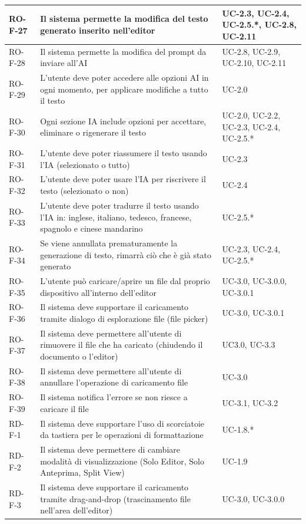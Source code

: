 \documentclass[11pt,a4paper]{article}
\begin{document}
\begin{longtable}{|p{}|>{\raggedright\arraybackslash}p{}|p{}|}
\hline
RO-F-27 & Il sistema permette la modifica del testo generato inserito nell'editor & UC-2.3, UC-2.4, UC-2.5.*, UC-2.8, UC-2.11 \\
\hline
RO-F-28 & Il sistema permette la modifica del prompt da inviare all'AI & UC-2.8, UC-2.9, UC-2.10, UC-2.11 \\
\hline
RO-F-29 & L'utente deve poter accedere alle opzioni AI in ogni momento, per applicare modifiche a tutto il testo & UC-2.0 \\
\hline
RO-F-30 & Ogni sezione IA include opzioni per accettare, eliminare o rigenerare il testo & UC-2.0, UC-2.2, UC-2.3, UC-2.4, UC-2.5.* \\
\hline
RO-F-31 & L'utente deve poter riassumere il testo usando l'IA (selezionato o tutto) & UC-2.3 \\
\hline
RO-F-32 & L'utente deve poter usare l'IA per riscrivere il testo (selezionato o non) & UC-2.4 \\
\hline
RO-F-33 & L'utente deve poter tradurre il testo usando l'IA in: inglese, italiano, tedesco, francese, spagnolo e cinese mandarino & UC-2.5.* \\
\hline
RO-F-34 & Se viene annullata prematuramente la generazione di testo, rimarrà ciò che è già stato generato & UC-2.3, UC-2.4, UC-2.5.* \\
\hline
RO-F-35 & L'utente può caricare/aprire un file dal proprio dispositivo all'interno dell'editor & UC-3.0, UC-3.0.0, UC-3.0.1 \\
\hline
RO-F-36 & Il sistema deve supportare il caricamento tramite dialogo di esplorazione file (file picker) & UC-3.0, UC-3.0.1 \\
\hline
RO-F-37 & Il sistema deve permettere all'utente di rimuovere il file che ha caricato (chiudendo il documento o l'editor) & UC3.0, UC-3.3 \\
\hline
RO-F-38 & Il sistema deve permettere all'utente di annullare l'operazione di caricamento file & UC-3.0 \\
\hline
RO-F-39 & Il sistema notifica l'errore se non riesce a caricare il file & UC-3.1, UC-3.2\\
\hline
RD-F-1 & Il sistema deve supportare l'uso di scorciatoie da tastiera per le operazioni di formattazione & UC-1.8.* \\
\hline
RD-F-2 & Il sistema deve permettere di cambiare modalità di visualizzazione (Solo Editor, Solo Anteprima, Split View) & UC-1.9 \\
\hline
RD-F-3 & Il sistema deve supportare il caricamento tramite drag-and-drop (trascinamento file nell'area dell'editor) & UC-3.0, UC-3.0.0 \\

\end{longtable}
\end{document}
